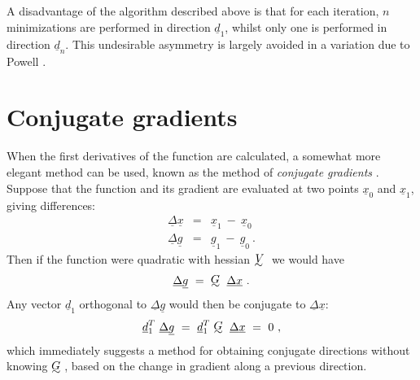       A disadvantage of the algorithm described above is that for each
iteration, $n$ minimizations are performed in direction ${\underline{d}}_1$, whilst only
one is performed in direction ${\underline{d}}_n$.  This undesirable asymmetry is largely
avoided in a variation due to Powell \cite{Powe1}.
 
\section{Conjugate gradients}
 
      When the first derivatives of the function are calculated, a somewhat
more elegant method can be used, known as the method of {\em conjugate
gradients} \cite{Flet1}. Suppose that the function and its gradient are evaluated
at two points ${\underline{x}}_0$ and ${\underline{x}}_1$, giving differences:
 \begin{eqnarray}
{\underline{\Delta}}{\underline{x}}&=&{\underline{x}}_1~-~{\underline{x}}_0\nonumber\\
{\underline{\Delta}}{\underline{g}}&=&{\underline{g}}_1~-~{\underline{g}}_0~.\nonumber
\end{eqnarray}
Then if the function were quadratic with hessian $\UTV$ we would have
 $${\underline{\Delta}}{\underline{g}}~=~\UTG~ {\underline{\Delta}}{\underline{x}}~.$$
Any vector ${\underline{d}}_1$ orthogonal to ${\underline{\Delta}}{\underline{g}}$
 would then be conjugate to ${\underline{\Delta}}{\underline{x}}$:
 $${\underline{d}}^T_1~{\underline{\Delta}}{\underline{g}}~=~
{\underline{d}}^T_1~\UTG~{\underline{\Delta}}{\underline{x}}~=~0~,$$
 which immediately suggests a method for obtaining conjugate directions
without knowing $\UTG$, based on the change in gradient along a previous
direction.
 
